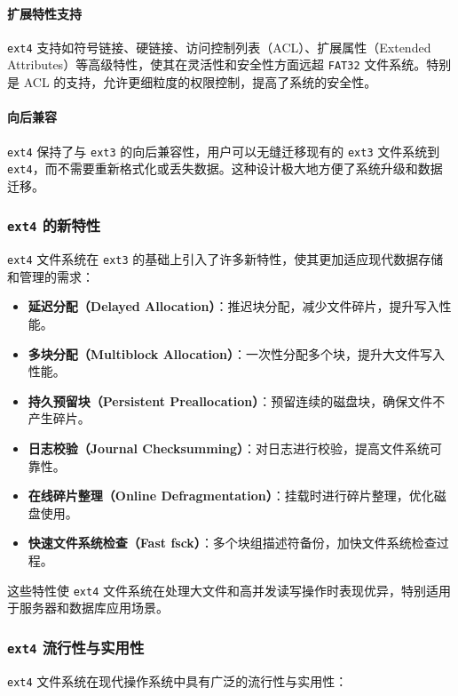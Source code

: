 \documentclass[UTF8]{article}
\begin{document}
\paragraph{扩展特性支持}
\texttt{ext4} 支持如符号链接、硬链接、访问控制列表（ACL）、扩展属性（Extended Attributes）等高级特性，使其在灵活性和安全性方面远超 \texttt{FAT32} 文件系统。特别是 ACL 的支持，允许更细粒度的权限控制，提高了系统的安全性。

\paragraph{向后兼容}
\texttt{ext4} 保持了与 \texttt{ext3} 的向后兼容性，用户可以无缝迁移现有的 \texttt{ext3} 文件系统到 \texttt{ext4}，而不需要重新格式化或丢失数据。这种设计极大地方便了系统升级和数据迁移。

\subsubsection{\texttt{ext4} 的新特性}

\texttt{ext4} 文件系统在 \texttt{ext3} 的基础上引入了许多新特性，使其更加适应现代数据存储和管理的需求：

\begin{itemize}
  \item \textbf{延迟分配（Delayed Allocation）}：推迟块分配，减少文件碎片，提升写入性能。
  \item \textbf{多块分配（Multiblock Allocation）}：一次性分配多个块，提升大文件写入性能。
  \item \textbf{持久预留块（Persistent Preallocation）}：预留连续的磁盘块，确保文件不产生碎片。
  \item \textbf{日志校验（Journal Checksumming）}：对日志进行校验，提高文件系统可靠性。
  \item \textbf{在线碎片整理（Online Defragmentation）}：挂载时进行碎片整理，优化磁盘使用。
  \item \textbf{快速文件系统检查（Fast fsck）}：多个块组描述符备份，加快文件系统检查过程。
\end{itemize}

这些特性使 \texttt{ext4} 文件系统在处理大文件和高并发读写操作时表现优异，特别适用于服务器和数据库应用场景。

\subsubsection{\texttt{ext4} 流行性与实用性}

\texttt{ext4} 文件系统在现代操作系统中具有广泛的流行性与实用性：
\end{document}
